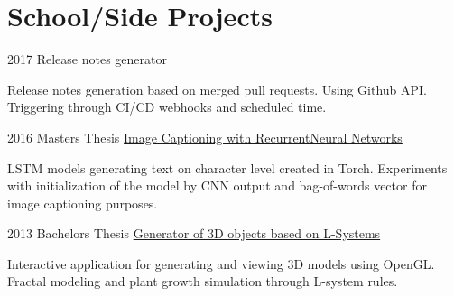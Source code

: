 \documentclass{tccv}
\begin{document}
\section{School/Side Projects}

\begin{eventlist}

	\item{2017}
	{}
	{Release notes generator}
	
	Release notes generation based on merged pull requests. Using Github API. Triggering through CI/CD webhooks and scheduled time.

	\item{2016}
	{Masters Thesis}
	{{\href{https://github.com/kvitajakub/MasterThesis}{Image Captioning with Recurrent\newline Neural Networks}}}
	
	LSTM models generating text on character level created in Torch. Experiments with initialization of the model by CNN output and bag-of-words vector for image captioning purposes. 
	
	\item{2013}
	{Bachelors Thesis}
	{{\href{https://github.com/kvitajakub/LSystemModeller}{Generator of 3D objects based on L-Systems}}}
	
	Interactive application for generating and viewing 3D models using OpenGL. Fractal modeling and plant growth simulation through L-system rules.
	
\end{eventlist}
\end{document}
